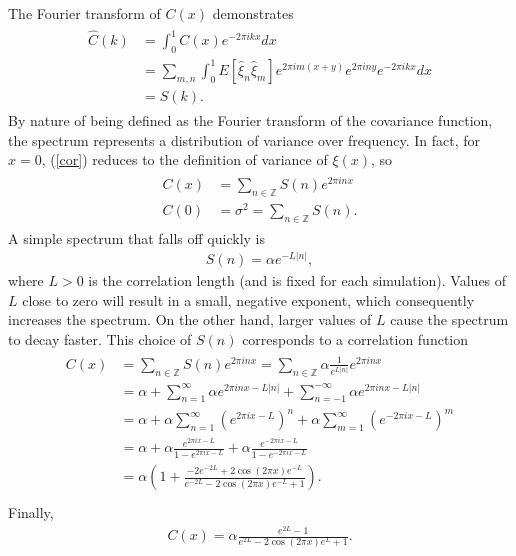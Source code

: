 The Fourier transform of $C(x)$ demonstrates
\begin{align*}
\begin{split}
\hat{C}(k) &= \int_{0}^{1}C(x)e^{-2\pi ikx}dx\\
&= \sum_{m,n} \int_{0}^{1} E[\hat{\xi}_n\hat{\xi}_m] e^{2\pi
  im(x+y)}e^{2\pi iny}e^{-2\pi ikx}dx\\
&=S(k).
\end{split}
\end{align*}
By nature of being defined as the Fourier transform of
the covariance function, the spectrum represents a distribution of variance over
frequency. In fact, for $x=0$, (\ref{cor}) reduces to the definition
of variance of $\xi(x)$, so 
\begin{align*}
\begin{split}
C(x) &= \sum_{n\in \mathbb{Z}}S(n)e^{2\pi inx}\\
C(0) &= \sigma^2 = \sum_{n\in \mathbb{Z}}S(n).
\end{split}
\end{align*}
A simple spectrum that falls off quickly is
\begin{align}\label{spec}
S(n)=\alpha e^{-L|n|},
\end{align}
where $L > 0$ is the correlation length (and is fixed
for each simulation). Values of $L$ close to zero will result in a
small, negative exponent, which consequently increases the
spectrum. On the other hand, larger values of $L$ cause
the spectrum to decay faster. This choice of $S(n)$ corresponds to a correlation function
\begin{align*}
\begin{split}
C(x) &= \sum_{n\in \mathbb{Z}}S(n)e^{2\pi inx}=\sum_{n\in \mathbb{Z}}\alpha \frac{1}{e^{L|n|}}e^{2\pi inx}\\
&= \alpha + \sum_{n=1}^{\infty}\alpha e^{2\pi
  inx-L|n|}+\sum_{n=-1}^{-\infty}\alpha e^{2\pi inx-L|n|}\\
&= \alpha+\alpha \sum_{n=1}^{\infty}(e^{2\pi ix-L})^n+\alpha \sum_{m=1}^{\infty}(e^{-2\pi ix-L})^m\\
&=\alpha + \alpha \frac{e^{2\pi ix-L}}{1-e^{2\pi ix-L}} +\alpha
\frac{e^{-2\pi ix-L}}{1-e^{-2\pi ix-L}}\\
&=\alpha \left(1+ \frac{-2e^{-2L}+2\cos(2\pi x)e^{-L}}{e^{-2L}-2\cos(2\pi x)e^{-L}+1} \right).\\
\end{split}
\end{align*}
Finally,
\begin{align}\label{cx}
C(x)= \alpha \frac{e^{2L}-1}{e^{2L}-2\cos(2\pi x)e^L+1}.
\end{align}
